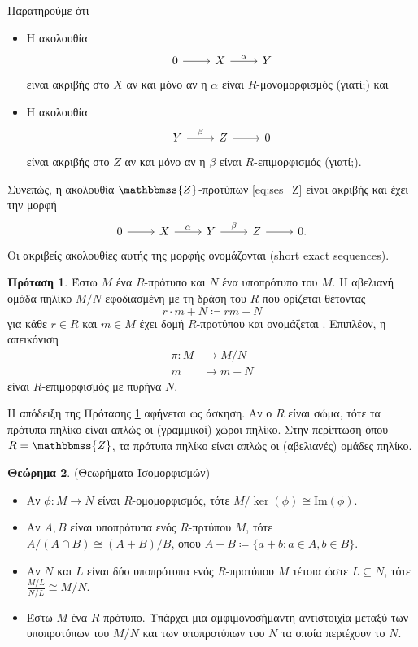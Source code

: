 \documentclass[12pt,a4paper,reqno]{amsart}
\theoremstyle{definition}
\newtheorem{theorem}{Θεώρημα}
\newtheorem{proposition}[theorem]{Πρόταση}
\theoremstyle{remark}
\numberwithin{theorem}{section}
\numberwithin{exercise}{section}
\numberwithin{equation}{section}
\newcommand{\ZZ}{\mathbbmss{Z}}
\renewcommand{\to}{\rightarrow}
\newcommand{\rmIm}{\mathrm{Im}}
\newcommand{\defn}[1]{{\color{mylightblue}{#1}}}
\begin{document}
Παρατηρούμε ότι 
\begin{itemize}
    \item Η ακολουθία 
    \[
    \begin{tikzcd}
        0 \arrow[r] & X \arrow[r, "\alpha"] & Y 
    \end{tikzcd}
    \]
    είναι ακριβής στο $X$ αν και μόνο αν η $\alpha$ είναι $R$-μονομορφισμός (γιατί;) και 
    \item Η ακολουθία 
    \[
    \begin{tikzcd}
         Y \arrow[r, "\beta"] & Z \arrow[r] & 0
    \end{tikzcd}
    \]
    είναι ακριβής στο $Z$ αν και μόνο αν η $\beta$ είναι $R$-επιμορφισμός (γιατί;).
\end{itemize}
Συνεπώς, η ακολουθία $\ZZ$-προτύπων \eqref{eq:ses_Z} είναι ακριβής και έχει την μορφή 
\[
\begin{tikzcd}
        0 \arrow[r] & X \arrow[r, "\alpha"] & Y \arrow[r, "\beta"] & Z \arrow[r] & 0.
\end{tikzcd}
\]
Οι ακριβείς ακολουθίες αυτής της μορφής ονομάζονται \defn{βραχείες ακριβείς ακολουθίες} (short exact sequences).

\begin{proposition}
    \label{prop:quotient_module}
    Έστω $M$ ένα $R$-πρότυπο και $N$ ένα υποπρότυπο του $M$. Η αβελιανή ομάδα πηλίκο $M/N$ εφοδιασμένη με τη δράση του $R$ που ορίζεται θέτοντας 
    \[
    r \cdot{m + N} \coloneqq rm + N
    \]
    για κάθε $r \in R$ και $m \in M$ έχει δομή $R$-προτύπου και ονομάζεται \defn{πρότυπο πηλίκο}. Επιπλέον, η απεικόνιση 
    \begin{align*}
            \pi : M &\to M/N \\ 
                  m &\mapsto m + N 
    \end{align*}
    είναι $R$-επιμορφισμός με πυρήνα $N$.
\end{proposition}

Η απόδειξη της Πρότασης \ref{prop:quotient_module} αφήνεται ως άσκηση. Αν ο $R$ είναι σώμα, τότε τα πρότυπα πηλίκο είναι απλώς οι (γραμμικοί) χώροι πηλίκο. Στην περίπτωση όπου $R=\ZZ$, τα πρότυπα πηλίκο είναι απλώς οι (αβελιανές) ομάδες πηλίκο.

\begin{theorem}{\rm(Θεωρήματα Ισομορφισμών)}
    \label{thm:isomorphism_theorems}
    \leavevmode
    \begin{itemize}
        \item[(1)] Αν $\phi : M \to N$ είναι $R$-ομομορφισμός, τότε $M/\ker(\phi) \cong \rmIm(\phi)$.
        \item[(2)] Αν $A, B$ είναι υποπρότυπα ενός $R$-πρτύπου $M$, τότε $A/(A\cap{B}) \cong (A+B)/B$, όπου $A + B \coloneqq \{a + b : a \in A, b \in B\}$.
        \item[(3)] Αν $N$ και $L$ είναι δύο υποπρότυπα ενός $R$-προτύπου $M$ τέτοια ώστε $L \subseteq N$, τότε $\frac{M/L}{N/L} \cong M/N$.
        \item[(4)] Έστω $M$ ένα $R$-πρότυπο. Υπάρχει μια αμφιμονοσήμαντη αντιστοιχία μεταξύ των υποπροτύπων του $M/N$ και των υποπροτύπων του $N$ τα οποία περιέχουν το $N$. 
    \end{itemize}
\end{theorem}
\end{document}
